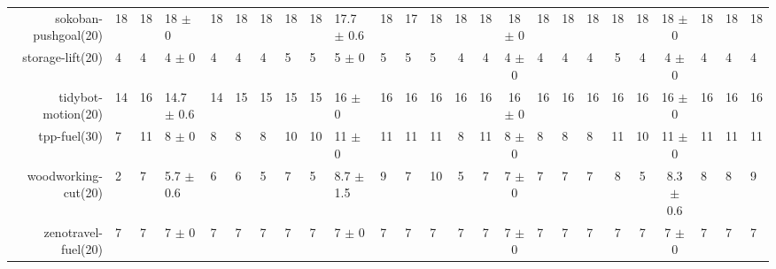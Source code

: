 \begin{center}
\begin{tabular}{|rHHHHHHHHHHHHcccHHH|cccHHH|}
sokoban-pushgoal(20) & 18 & 18 & 18 \(\pm\) 0 & 18 & 18 & 18 & 18 & 18 & 17.7 \(\pm\) 0.6 & 18 & 17 & 18 & 18 & 18 & 18 \(\pm\) 0 & 18 & 18 & 18 & 18 & 18 & 18 \(\pm\) 0 & 18 & 18 & 18\\
storage-lift(20) & 4 & 4 & 4 \(\pm\) 0 & 4 & 4 & 4 & 5 & 5 & 5 \(\pm\) 0 & 5 & 5 & 5 & 4 & 4 & 4 \(\pm\) 0 & 4 & 4 & 4 & 5 & 4 & 4 \(\pm\) 0 & 4 & 4 & 4\\
tidybot-motion(20) & 14 & 16 & 14.7 \(\pm\) 0.6 & 14 & 15 & 15 & 15 & 15 & 16 \(\pm\) 0 & 16 & 16 & 16 & 16 & 16 & 16 \(\pm\) 0 & 16 & 16 & 16 & 16 & 16 & 16 \(\pm\) 0 & 16 & 16 & 16\\
tpp-fuel(30) & 7 & 11 & 8 \(\pm\) 0 & 8 & 8 & 8 & 10 & 10 & 11 \(\pm\) 0 & 11 & 11 & 11 & 8 & 11 & 8 \(\pm\) 0 & 8 & 8 & 8 & 11 & 10 & 11 \(\pm\) 0 & 11 & 11 & 11\\
woodworking-cut(20) & 2 & 7 & 5.7 \(\pm\) 0.6 & 6 & 6 & 5 & 7 & 5 & 8.7 \(\pm\) 1.5 & 9 & 7 & 10 & 5 & 7 & 7 \(\pm\) 0 & 7 & 7 & 7 & 8 & 5 & 8.3 \(\pm\) 0.6 & 8 & 8 & 9\\
zenotravel-fuel(20) & 7 & 7 & 7 \(\pm\) 0 & 7 & 7 & 7 & 7 & 7 & 7 \(\pm\) 0 & 7 & 7 & 7 & 7 & 7 & 7 \(\pm\) 0 & 7 & 7 & 7 & 7 & 7 & 7 \(\pm\) 0 & 7 & 7 & 7\\
\end{tabular}
\end{center}
